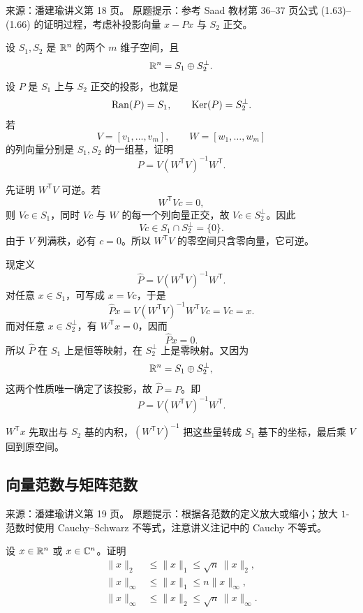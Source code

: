 \begin{homework}[第 5 题：定理 1.29]
\par\smallskip\textsf{来源：潘建瑜讲义第 18 页。}
原题提示：参考 Saad 教材第 36--37 页公式 (1.63)--(1.66) 的证明过程，考虑补投影向量 $x-Px$ 与 $S_2$ 正交。\par\smallskip

设 $S_1,S_2$ 是 $\mathbb{R}^n$ 的两个 $m$ 维子空间，且
\[
\mathbb{R}^n=S_1\oplus S_2^\perp.
\]
设 $P$ 是 $S_1$ 上与 $S_2$ 正交的投影，也就是
\[
\operatorname{Ran}(P)=S_1,
\qquad
\operatorname{Ker}(P)=S_2^\perp.
\]
若
\[
V=[v_1,\dots,v_m],\qquad W=[w_1,\dots,w_m]
\]
的列向量分别是 $S_1,S_2$ 的一组基，证明
\[
P=V(W^{\mathsf T}V)^{-1}W^{\mathsf T}.
\]
\end{homework}

\begin{solution}
先证明 $W^{\mathsf T}V$ 可逆。若
\[
W^{\mathsf T}Vc=0,
\]
则 $Vc\in S_1$，同时 $Vc$ 与 $W$ 的每一个列向量正交，故 $Vc\in S_2^\perp$。因此
\[
Vc\in S_1\cap S_2^\perp=\{0\}.
\]
由于 $V$ 列满秩，必有 $c=0$。所以 $W^{\mathsf T}V$ 的零空间只含零向量，它可逆。

现定义
\[
\widehat P=V(W^{\mathsf T}V)^{-1}W^{\mathsf T}.
\]
对任意 $x\in S_1$，可写成 $x=Vc$，于是
\[
\widehat Px
=V(W^{\mathsf T}V)^{-1}W^{\mathsf T}Vc
=Vc=x.
\]
而对任意 $x\in S_2^\perp$，有 $W^{\mathsf T}x=0$，因而
\[
\widehat Px=0.
\]
所以 $\widehat P$ 在 $S_1$ 上是恒等映射，在 $S_2^\perp$ 上是零映射。又因为
\[
\mathbb{R}^n=S_1\oplus S_2^\perp,
\]
这两个性质唯一确定了该投影，故 $\widehat P=P$。即
\[
P=V(W^{\mathsf T}V)^{-1}W^{\mathsf T}.
\]
\end{solution}

\begin{dxtips}[投影公式怎么记]\label{hw:matrix:tip5}
$W^{\mathsf T}x$ 先取出与 $S_2$ 基的内积，$(W^{\mathsf T}V)^{-1}$ 把这些量转成 $S_1$ 基下的坐标，最后乘 $V$ 回到原空间。
\end{dxtips}

\subsection*{向量范数与矩阵范数}

\begin{homework}[第 6 题：定理 1.33]
\par\smallskip\textsf{来源：潘建瑜讲义第 19 页。}
原题提示：根据各范数的定义放大或缩小；放大 $1$-范数时使用 Cauchy--Schwarz 不等式，注意讲义注记中的 Cauchy 不等式。\par\smallskip

设 $x\in\mathbb{R}^n$ 或 $x\in\mathbb{C}^n$。证明
\begin{align*}
\|x\|_2&\le\|x\|_1\le\sqrt n\,\|x\|_2,\\
\|x\|_\infty&\le\|x\|_1\le n\|x\|_\infty,\\
\|x\|_\infty&\le\|x\|_2\le\sqrt n\,\|x\|_\infty.
\end{align*}
\end{homework}

